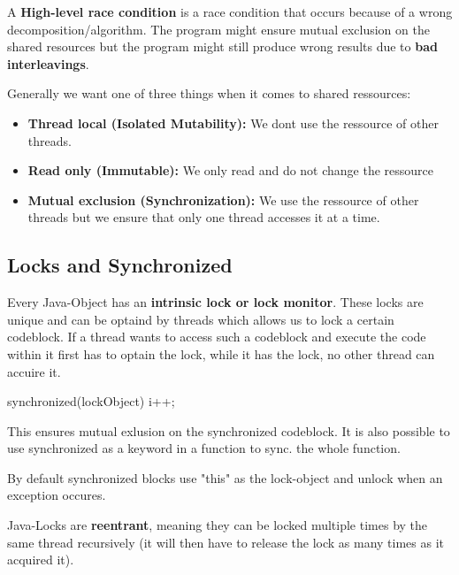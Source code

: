 \begin{definition}
    A \textbf{High-level race condition} is a race condition that
    occurs because of a wrong decomposition/algorithm. The program might ensure mutual exclusion on the
    shared resources but the program might still produce wrong results due to \textbf{bad interleavings}.
\end{definition}

Generally we want one of three things when it comes to shared ressources:
\begin{itemize}
    \item \textbf{Thread local (Isolated Mutability):} We dont use the ressource of other threads.
    \item \textbf{Read only (Immutable):} We only read and do not change the ressource
    \item \textbf{Mutual exclusion (Synchronization):} We use the ressource of other threads but we ensure that only one thread accesses it at a time.
\end{itemize}


\subsection{Locks and Synchronized}

Every Java-Object has an \textbf{intrinsic lock or lock monitor}. These locks are unique and can be optaind by
threads which allows us to lock a certain codeblock. If a thread wants to access such a codeblock and
execute the code within it first has to optain the lock, while it has the lock, no other thread can accuire
it.

\begin{codeexample}
synchronized(lockObject) {
    i++;
}
\end{codeexample}

This ensures mutual exlusion on the synchronized codeblock. It is also possible to use synchronized as a
keyword in a function to sync. the whole function.

\begin{remark}
    By default synchronized blocks use "this" as the lock-object and unlock when an exception occures.
\end{remark}

\begin{remark}
    Java-Locks are \textbf{reentrant}, meaning they can be locked multiple times by the same thread recursively (it
    will then have to release the lock as many times as it acquired it).
\end{remark}

